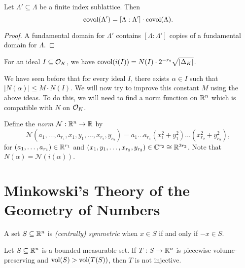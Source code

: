 \begin{prop}
  Let $\Lambda' \subseteq \Lambda$ be a finite
  index sublattice. Then
  \[
    \operatorname{covol}(\Lambda') = [\Lambda : \Lambda'] \cdot \operatorname{covol}(\Lambda).
  \]
\end{prop}

\begin{proof}
  A fundamental domain for $\Lambda'$ contains
  $[\Lambda : \Lambda']$ copies of a fundamental domain
  for $\Lambda$.
\end{proof}

\begin{corollary}
  For an ideal $I \subseteq \mathcal{O}_K$, we have
  $\operatorname{covol}(i(I)) = N(I) \cdot 2^{-r_2} \sqrt{|\Delta_K|}$.
\end{corollary}

\begin{remark}
  We have seen before that for every ideal $I$, there
  exists $\alpha \in I$ such that
  $|N(\alpha)| \le M \cdot N(I)$.
  We will now try to improve this constant $M$ using
  the above ideas. To do this, we will need to find a
  norm function on $\mathbb{R}^n$ which is compatible with
  $N$ on $\mathcal{O}_K$.
\end{remark}

\begin{definition}
  Define the \emph{norm} $\mathcal{N} : \mathbb{R}^n \to \mathbb{R}$ by
  \[
    \mathcal{N}(a_1, \dots, a_{r_1}, x_1, y_1, \dots, x_{r_2}, y_{r_2}) = a_1 \dots a_{r_1} (x_1^2 + y_1^2) \dots (x_{r_2}^2 + y_{r_2}^2),
  \]
  for $(a_1, \dots, a_{r_1}) \in \mathbb{R}^{r_1}$ and
  $(x_1, y_1, \dots, x_{r_2}, y_{r_2}) \in \mathbb{C}^{r_2} \cong \mathbb{R}^{2r_2}$.
  Note that $N(\alpha) = \mathcal{N}(i(\alpha))$.
\end{definition}

\section{Minkowski's Theory of the Geometry of Numbers}

\begin{definition}
  A set $S \subseteq \mathbb{R}^n$ is \emph{(centrally) symmetric} when
  $x \in S$ if and only if $-x \in S$.
\end{definition}

\begin{lemma}
  Let $S \subseteq \mathbb{R}^n$ is a bounded measurable
  set. If $T : S \to \mathbb{R}^n$ is piecewise volume-preserving
  and $\operatorname{vol}(S) > \operatorname{vol}(T(S))$, then $T$ is not injective.
\end{lemma}


